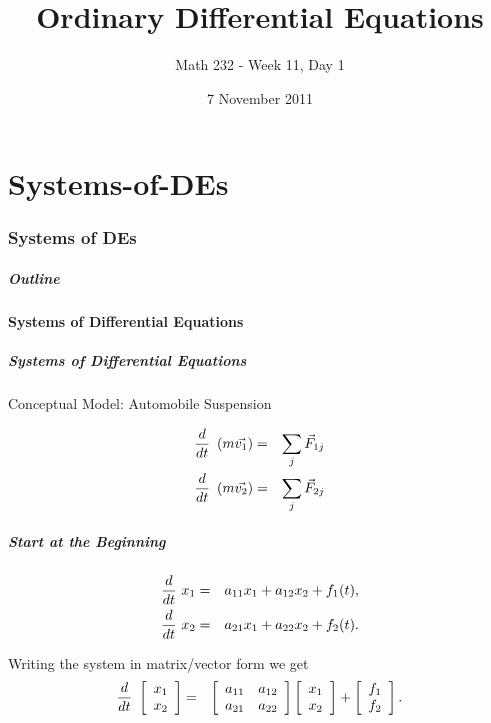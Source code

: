 \part{Systems-of-DEs}
\section{Systems of DEs}


\title{Ordinary Differential Equations}
\subtitle{Math 232 - Week 11, Day 1}
\date{7 November 2011}

\begin{frame}
  \titlepage
\end{frame}

\begin{frame}
  \frametitle{Outline}
\end{frame}


\subsection{Systems of Differential Equations}


\begin{frame}
  \frametitle{Systems of Differential Equations}

  Conceptual Model: Automobile Suspension

  \begin{eqnarray*}
    \deriv{~}{t} \lp m \vec{v_1} \rp & = & \sum_j \vec{F}_{1j} \\
    \deriv{~}{t} \lp m \vec{v_2} \rp & = & \sum_j \vec{F}_{2j} 
  \end{eqnarray*}

\end{frame}


\begin{frame}
  \frametitle{Start at the Beginning}

  \begin{eqnarray*}
    \deriv{~}{t} x_1  & = & a_{11} x_1 + a_{12} x_2 + f_1(t), \\
    \deriv{~}{t} x_2  & = & a_{21} x_1 + a_{22} x_2 + f_2(t).
  \end{eqnarray*}

  Writing the system in matrix/vector form we get
  \begin{eqnarray*}
    \deriv{~}{t} \vecTwo{x_1}{x_2} & = & 
    \arrayTwo{a_{11}}{a_{12}}{a_{21}}{a_{22}} \vecTwo{x_1}{x_2} + 
    \vecTwo{f_1}{f_2}.
  \end{eqnarray*}

\end{frame}


